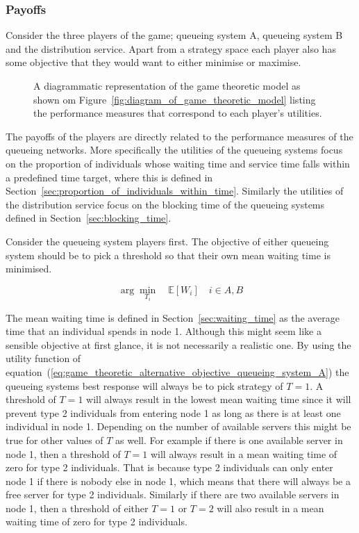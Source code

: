 \subsubsection{Payoffs}

Consider the three players of the game; queueing system A, queueing system B and
the distribution service.
Apart from a strategy space each player also has some objective that they would
want to either minimise or maximise.

\begin{figure}[H]
    
    \caption{A diagrammatic representation of the game theoretic model as shown
    om Figure~\ref{fig:diagram_of_game_theoretic_model} listing the performance
    measures that correspond to each player's utilities.}
    \label{fig:diagram_of_game_theoretic_model_objectives}
\end{figure}


The payoffs of the players are directly related to the performance measures of
the queueing networks.
More specifically the utilities of the queueing systems focus on the proportion
of individuals whose waiting time and service time falls within a predefined
time target, where this is defined in
Section~\ref{sec:proportion_of_individuals_within_time}.
Similarly the utilities of the distribution service focus on the blocking time
of the queueing systems defined in Section~\ref{sec:blocking_time}.

Consider the queueing system players first.
The objective of either queueing system should be to pick a threshold so that
their own mean waiting time is minimised.

\begin{equation}\label{eq:game_theoretic_alternative_objective_queueing_system_A}
    \arg \min_{T_i} \quad \mathbb{E}[W_i] \quad i \in {A, B}
\end{equation}

The mean waiting time is defined in Section~\ref{sec:waiting_time} as the
average time that an individual spends in node 1.
Although this might seem like a sensible objective at first glance, it is not
necessarily a realistic one.
By using the utility function of
equation~(\ref{eq:game_theoretic_alternative_objective_queueing_system_A})
the queueing systems best response will always be to pick strategy of \(T=1\).
A threshold of \(T=1\) will always result in the lowest mean waiting time
since it will prevent type 2 individuals from entering node 1 as long as there
is at least one individual in node 1.
Depending on the number of available servers this might be true for other values
of \(T\) as well.
For example if there is one available server in node 1, then a threshold of
\(T=1\) will always result in a mean waiting time of zero for type 2
individuals.
That is because type 2 individuals can only enter node 1 if there is nobody
else in node 1, which means that there will always be a free server for type 2
individuals.
Similarly if there are two available servers in node 1, then a threshold of
either \(T=1\) or \(T=2\) will also result in a mean waiting time of zero for
type 2 individuals.

